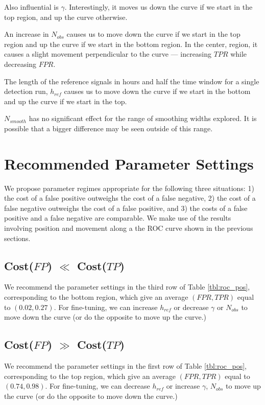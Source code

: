 Also influential is $\gamma$. Interestingly, it moves us down the curve
if we start in the top region, and up the curve otherwise. 


An increase in $N_{obs}$ causes us to move down the curve if we start in the top
region and up the curve if we start in the bottom region. In the center, region,
it causes a slight movement perpendicular to the curve --- increasing $TPR$
while decreasing $FPR$.

The length of the reference signals in hours and half the time window for a
single detection run, $h_{ref}$ causes us to move down the curve if we start in
the bottom and up the curve if we start in the top.

$N_{smooth}$ has no significant effect for the range of smoothing widths
explored. It is possible that a bigger difference may be seen outside of this
range.

\section{Recommended Parameter Settings}

We propose parameter regimes appropriate for the following three situations: 1)
the cost of a false positive outweighs the cost of a false negative, 2) the cost
of a false negative outweighs the cost of a false positive, and 3) the costs of
a false positive and a false negative are comparable. We make use of the results
involving position and movement along a the ROC curve shown in the previous
sections.

\subsection{Cost($FP$) $\ll$ Cost($TP$)}
We recommend the parameter settings in the third row of Table \ref{tbl:roc_pos},
corresponding to the bottom region, which give an average $(FPR,TPR)$ equal to
$(0.02,0.27)$. For fine-tuning, we can increase $h_{ref}$ or decrease $\gamma$ or
$N_{obs}$ to move down the curve (or do the opposite to move up the curve.)

\subsection{Cost($FP$) $\gg$ Cost($TP$)}
We recommend the parameter settings in the first row of Table \ref{tbl:roc_pos},
corresponding to the top region, which give an average $(FPR,TPR)$ equal to
$(0.74,0.98)$. For fine-tuning, we can decrease $h_{ref}$ or increase $\gamma$,
$N_{obs}$ to move up the curve (or do the opposite to move down the curve.)

